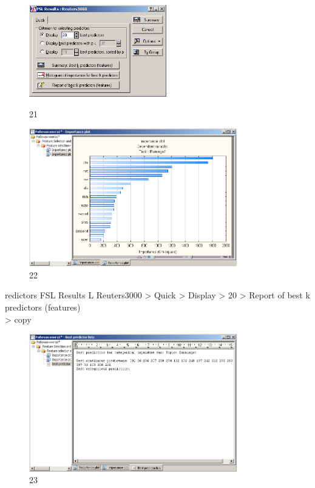 \begin{figure}[!h]
  \centering

  \begin{minipage}{0.29\textwidth}
    \centering

    \includegraphics[height=4cm]
    {inc/21.PNG}

    \caption{21}

    \label{fig:21}
  \end{minipage}
  \begin{minipage}{0.69\textwidth}
    \centering

    \includegraphics[height=6cm]
    {inc/22.PNG}

    \caption{22}

    \label{fig:22}
  \end{minipage}
\end{figure}

redictors
FSL Results L Reuters3000 > Quick > Display > 20 > Report of best k predictors (features) \\
> copy

\begin{figure}[!h]
  \centering

  \includegraphics[height=6cm]
  {inc/23.PNG}

  \caption{23}

  \label{fig:23}
\end{figure}

